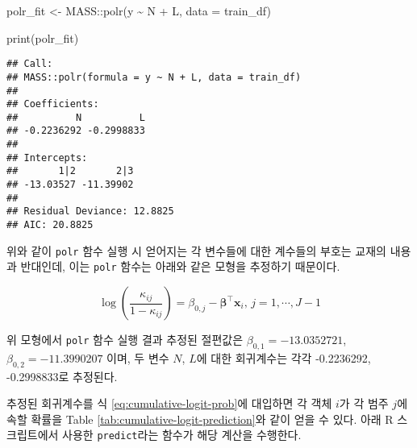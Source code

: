 \documentclass[
]{book}
\newenvironment{Shaded}{\begin{snugshade}}{\end{snugshade}}
\newcommand{\AttributeTok}[1]{\textcolor[rgb]{0.77,0.63,0.00}{#1}}
\newcommand{\FunctionTok}[1]{\textcolor[rgb]{0.00,0.00,0.00}{#1}}
\newcommand{\NormalTok}[1]{#1}
\newcommand{\OtherTok}[1]{\textcolor[rgb]{0.56,0.35,0.01}{#1}}
\newcommand{\SpecialCharTok}[1]{\textcolor[rgb]{0.00,0.00,0.00}{#1}}
\begin{document}
\begin{Shaded}
\begin{Highlighting}[]
\NormalTok{polr\_fit }\OtherTok{\textless{}{-}}\NormalTok{ MASS}\SpecialCharTok{::}\FunctionTok{polr}\NormalTok{(y }\SpecialCharTok{\textasciitilde{}}\NormalTok{ N }\SpecialCharTok{+}\NormalTok{ L, }\AttributeTok{data =}\NormalTok{ train\_df)}

\FunctionTok{print}\NormalTok{(polr\_fit)}
\end{Highlighting}
\end{Shaded}

\begin{verbatim}
## Call:
## MASS::polr(formula = y ~ N + L, data = train_df)
## 
## Coefficients:
##          N          L 
## -0.2236292 -0.2998833 
## 
## Intercepts:
##       1|2       2|3 
## -13.03527 -11.39902 
## 
## Residual Deviance: 12.8825 
## AIC: 20.8825
\end{verbatim}

위와 같이 \texttt{polr} 함수 실행 시 얻어지는 각 변수들에 대한 계수들의 부호는 교재\citep{jun2012datamining}의 내용과 반대인데, 이는 \texttt{polr} 함수는 아래와 같은 모형을 추정하기 때문이다.

\begin{equation*}
\log \left( \frac{\kappa_{ij}}{1 - \kappa_{ij}} \right) = \beta_{0,j} - \boldsymbol\beta^\top \mathbf{x}_i, \, j = 1, \cdots, J - 1
\end{equation*}

위 모형에서 \texttt{polr} 함수 실행 결과 추정된 절편값은 \(\beta_{0,1} = -13.0352721\), \(\beta_{0,2} = -11.3990207\) 이며, 두 변수 \(N\), \(L\)에 대한 회귀계수는 각각 -0.2236292, -0.2998833로 추정된다.

추정된 회귀계수를 식 \eqref{eq:cumulative-logit-prob}에 대입하면 각 객체 \(i\)가 각 범주 \(j\)에 속할 확률을 Table \ref{tab:cumulative-logit-prediction}와 같이 얻을 수 있다. 아래 R 스크립트에서 사용한 \texttt{predict}라는 함수가 해당 계산을 수행한다.
\end{document}
